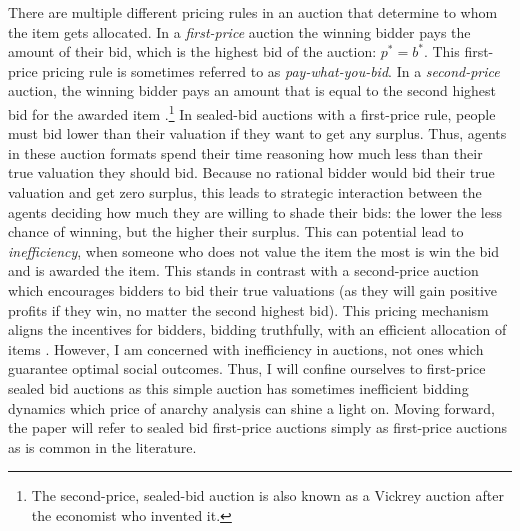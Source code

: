 \documentclass[12pt,twoside]{reedthesis}
\begin{document}
There are multiple different pricing rules in an auction that determine to whom the item gets allocated. In a {\em first-price} auction the winning bidder pays the amount of their bid, which is the highest bid of the auction: $p^* = b^*$. This first-price pricing rule is sometimes referred to as {\em pay-what-you-bid}. In a {\em second-price} auction, the winning bidder pays an amount that is equal to the second highest bid for the awarded item \citep{Vickrey1961}.\footnote{The second-price, sealed-bid auction is also known as a Vickrey auction after the economist who invented it.} In sealed-bid auctions with a first-price rule, people must bid lower than their valuation if they want to get any surplus. Thus, agents in these auction formats spend their time reasoning how much less than their true valuation they should bid. Because no rational bidder would bid their true valuation and get zero surplus, this leads to strategic interaction between the agents deciding how much they are willing to shade their bids: the lower the less chance of winning, but the higher their surplus. This can potential lead to {\em inefficiency}, when someone who does not value the item the most is win the bid and is awarded the item. This stands in contrast with a second-price auction which encourages bidders to bid their true valuations (as they will gain positive profits if they win, no matter the second highest bid). This pricing mechanism aligns the incentives for bidders, bidding truthfully, with an efficient allocation of items \citep{Mochon2015}. However, I am concerned with inefficiency in auctions, not ones which guarantee optimal social outcomes. Thus, I will confine ourselves to first-price sealed bid auctions as this simple auction has sometimes inefficient bidding dynamics which price of anarchy analysis can shine a light on. Moving forward, the paper will refer to sealed bid first-price auctions simply as first-price auctions as is common in the literature. 
\end{document}
